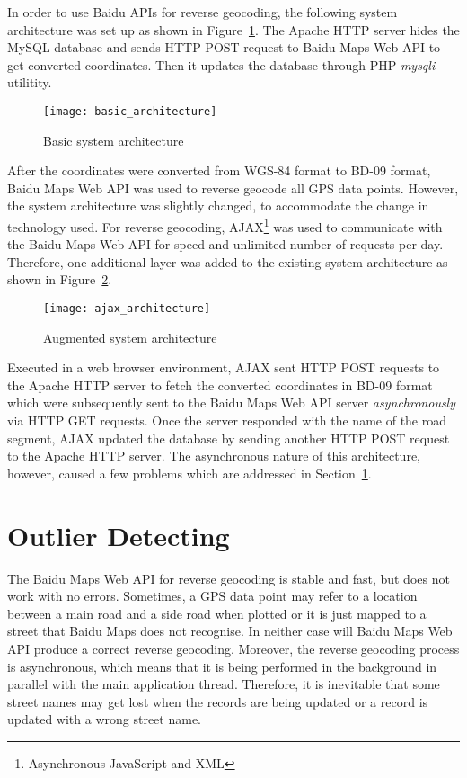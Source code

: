In order to use Baidu APIs for reverse geocoding, the following system architecture was set up as shown in Figure~\ref{Fig:basic_architecture}. The Apache HTTP server hides the MySQL database and sends HTTP POST request to Baidu Maps Web API to get converted coordinates. Then it updates the database through PHP \emph{mysqli} utilitity. 

\begin{figure}[h]
\texttt{[image: basic\_architecture]}
\centering
\caption{Basic system architecture}\label{Fig:basic_architecture}
\end{figure}

After the coordinates were converted from WGS-84 format to BD-09 format, Baidu Maps Web API was used to reverse geocode all GPS data points. However, the system architecture was slightly changed, to accommodate the change in technology used. For reverse geocoding, AJAX\footnote{Asynchronous JavaScript and XML} was used to communicate with the Baidu Maps Web API for speed and unlimited number of requests per day. Therefore, one additional layer was added to the existing system architecture as shown in Figure~\ref{Fig:ajax_architecture}. 

\begin{figure}[h]
\texttt{[image: ajax\_architecture]}
\centering
\caption{Augmented system architecture}\label{Fig:ajax_architecture}
\end{figure}

Executed in a web browser environment, AJAX sent HTTP POST requests to the Apache HTTP server to fetch the converted coordinates in BD-09 format which were subsequently sent to the Baidu Maps Web API server \emph{asynchronously} via HTTP GET requests. Once the server responded with the name of the road segment, AJAX updated the database by sending another HTTP POST request to the Apache HTTP server. The asynchronous nature of this architecture, however, caused a few problems which are addressed in Section~\ref{outlier_detecting}. 

\section{Outlier Detecting}\label{outlier_detecting}
The Baidu Maps Web API for reverse geocoding is stable and fast, but does not work with no errors. Sometimes, a GPS data point may refer to a location between a main road and a side road when plotted or it is just mapped to a street that Baidu Maps does not recognise. In neither case will Baidu Maps Web API produce a correct reverse geocoding. Moreover, the reverse geocoding process is asynchronous, which means that it is being performed in the background in parallel with the main application thread. Therefore, it is inevitable that some street names may get lost when the records are being updated or a record is updated with a wrong street name. 

